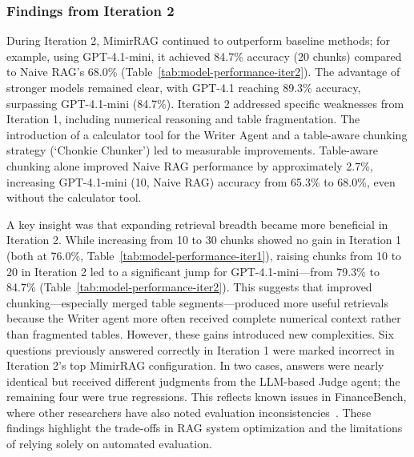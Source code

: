 \documentclass[final,5p,times,twopage,twocolumn,a4paper]{elsarticle}
\begin{document}
\subsubsection{Findings from Iteration 2}
During Iteration 2, MimirRAG continued to outperform baseline methods; for example, using GPT-4.1-mini, it achieved 84.7\% accuracy (20 chunks) compared to Naive RAG's 68.0\% (Table~\ref{tab:model-performance-iter2}). The advantage of stronger models remained clear, with GPT-4.1 reaching 89.3\% accuracy, surpassing GPT-4.1-mini (84.7\%). Iteration 2 addressed specific weaknesses from Iteration 1, including numerical reasoning and table fragmentation. The introduction of a calculator tool for the Writer Agent and a table-aware chunking strategy (`Chonkie Chunker') led to measurable improvements. Table-aware chunking alone improved Naive RAG performance by approximately 2.7\%, increasing GPT-4.1-mini (10, Naive RAG) accuracy from 65.3\% to 68.0\%, even without the calculator tool.

A key insight was that expanding retrieval breadth became more beneficial in Iteration 2. While increasing from 10 to 30 chunks showed no gain in Iteration 1 (both at 76.0\%, Table~\ref{tab:model-performance-iter1}), raising chunks from 10 to 20 in Iteration 2 led to a significant jump for GPT-4.1-mini—from  79.3\% to 84.7\% (Table~\ref{tab:model-performance-iter2}). This suggests that improved chunking—especially merged table segments—produced more useful retrievals because the Writer agent more often received complete numerical context rather than fragmented tables. However, these gains introduced new complexities. Six questions previously answered correctly in Iteration 1 were marked incorrect in Iteration 2’s top MimirRAG configuration. In two cases, answers were nearly identical but received different judgments from the LLM-based Judge agent; the remaining four were true regressions. This reflects known issues in FinanceBench, where other researchers have also noted evaluation inconsistencies~\cite{nguyen2024enhancing,vectify2025mafingithub}. These findings highlight the trade-offs in RAG system optimization and the limitations of relying solely on automated evaluation.
\end{document}
